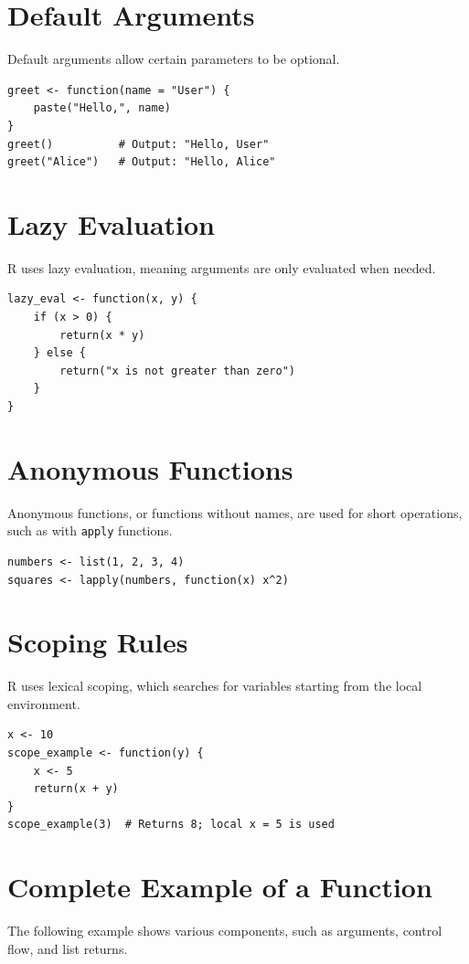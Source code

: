 \documentclass[10pt]{book}
\begin{document}
\section{Default Arguments}
Default arguments allow certain parameters to be optional.

\begin{lstlisting}
greet <- function(name = "User") {
    paste("Hello,", name)
}
greet()          # Output: "Hello, User"
greet("Alice")   # Output: "Hello, Alice"
\end{lstlisting}

\section{Lazy Evaluation}
R uses lazy evaluation, meaning arguments are only evaluated when needed.

\begin{lstlisting}
lazy_eval <- function(x, y) {
    if (x > 0) {
        return(x * y)
    } else {
        return("x is not greater than zero")
    }
}
\end{lstlisting}

\section{Anonymous Functions}
Anonymous functions, or functions without names, are used for short operations, such as with \texttt{apply} functions.

\begin{lstlisting}
numbers <- list(1, 2, 3, 4)
squares <- lapply(numbers, function(x) x^2)
\end{lstlisting}

\section{Scoping Rules}
R uses lexical scoping, which searches for variables starting from the local environment.

\begin{lstlisting}
x <- 10
scope_example <- function(y) {
    x <- 5
    return(x + y)
}
scope_example(3)  # Returns 8; local x = 5 is used
\end{lstlisting}

\section{Complete Example of a Function}
The following example shows various components, such as arguments, control flow, and list returns.
\end{document}
